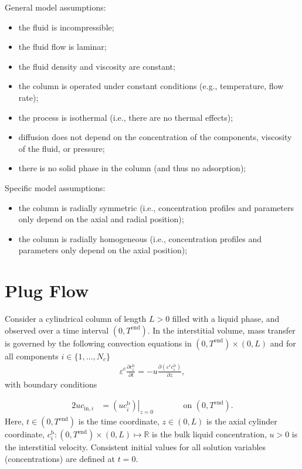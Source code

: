 \documentclass{article}
\begin{document}
General model assumptions:
\begin{itemize}
\item the fluid is incompressible;
\item the fluid flow is laminar;
\item the fluid density and viscosity are constant;
\item the column is operated under constant conditions (e.g., temperature, flow rate);
\item the process is isothermal (i.e., there are no thermal effects);
\item diffusion does not depend on the concentration of the components, viscosity of the fluid, or pressure;
\item there is no solid phase in the column (and thus no adsorption);
\end{itemize}


Specific model assumptions:
\begin{itemize}
\item the column is radially symmetric (i.e., concentration profiles and parameters only depend on the axial and radial position);
\item the column is radially homogeneous (i.e., concentration profiles and parameters only depend on the axial position);
\end{itemize}


\section*{Plug Flow}
Consider a cylindrical column of length $L > 0$ filled with a liquid phase, and observed over a time interval $(0, T^{\mathrm{end}})$.
In the interstitial volume, mass transfer is governed by the following convection equations in $(0, T^\mathrm{end})\times (0, L)$ and for all components $i\in\{1, \dots, N_c\}$
\begin{align}
\varepsilon^{\mathrm{c}} \frac{\partial c^{\mathrm{b}}_i}{\partial t} = - u \frac{\partial \left( \varepsilon^{\mathrm{c}} c^{\mathrm{b}}_i \right)}{\partial z},
\end{align}
with boundary conditions

\begin{alignat}{2}
u c_{\mathrm{in},i} &= \left.\left( u c^{\mathrm{b}}_i \right)\right|_{z=0} & &\qquad\text{on }(0, T^{\mathrm{end}}).
\end{alignat}
Here, $t\in (0, T^{\mathrm{end}})$ is the time coordinate, $z\in (0, L)$ is the axial cylinder coordinate, $c^\mathrm{b}_i\colon (0, T^\mathrm{end})\times (0, L) \mapsto \mathbb{R}$ is the bulk liquid concentration, $u> 0$ is the interstitial velocity.
Consistent initial values for all solution variables (concentrations) are defined at $t = 0$.
\end{document}
